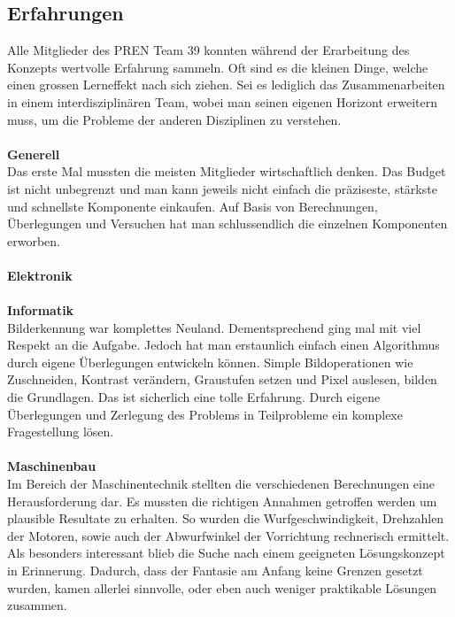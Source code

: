 \subsection{Erfahrungen}
Alle Mitglieder des PREN Team 39 konnten während der Erarbeitung des Konzepts wertvolle Erfahrung sammeln. Oft sind es die kleinen Dinge, welche einen grossen Lerneffekt nach sich ziehen. Sei es lediglich das Zusammenarbeiten in einem interdisziplinären Team, wobei man seinen eigenen Horizont erweitern muss, um die Probleme der anderen Disziplinen zu verstehen.\\
\\
\textbf{Generell}\\
Das erste Mal mussten die meisten Mitglieder wirtschaftlich denken. Das Budget ist nicht unbegrenzt und man kann jeweils nicht einfach die präziseste, stärkste und schnellste Komponente einkaufen. Auf Basis von Berechnungen, Überlegungen und Versuchen hat man schlussendlich die einzelnen Komponenten erworben.\\
\\
\textbf{Elektronik}\\
\\
\textbf{Informatik}\\
Bilderkennung war komplettes Neuland. Dementsprechend ging mal mit viel Respekt an die Aufgabe. Jedoch hat man erstaunlich einfach einen Algorithmus durch eigene Überlegungen entwickeln können. Simple Bildoperationen wie Zuschneiden, Kontrast verändern, Graustufen setzen und Pixel auslesen, bilden die Grundlagen. Das ist sicherlich eine tolle Erfahrung. Durch eigene Überlegungen und Zerlegung des Problems in Teilprobleme ein komplexe Fragestellung lösen.\\
\\
\textbf{Maschinenbau}\\
Im Bereich der Maschinentechnik stellten die verschiedenen Berechnungen eine Herausforderung dar. Es mussten die richtigen Annahmen getroffen werden um plausible Resultate zu erhalten. So wurden die Wurfgeschwindigkeit, Drehzahlen der Motoren, sowie auch der Abwurfwinkel der Vorrichtung rechnerisch ermittelt.
Als besonders interessant blieb die Suche nach einem geeigneten Lösungskonzept in Erinnerung. Dadurch, dass der Fantasie am Anfang keine Grenzen gesetzt wurden, kamen allerlei sinnvolle, oder eben auch weniger praktikable Lösungen zusammen.\\
\\